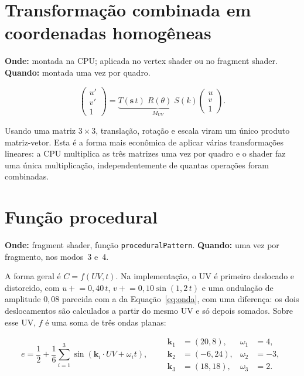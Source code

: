 \section{Transformação combinada em coordenadas homogêneas}

\textbf{Onde:} montada na CPU; aplicada no vertex shader ou no fragment shader. \textbf{Quando:} montada uma vez por quadro.

\begin{equation}
\begin{pmatrix}u'\\v'\\1\end{pmatrix}=
\underbrace{T(\mathbf{s}\,t)\;R(\theta)\;S(k)}_{M_{UV}}
\begin{pmatrix}u\\v\\1\end{pmatrix}.
\label{eq:combinada}
\end{equation}

Usando uma matriz \(3\times3\), translação, rotação e escala viram um único produto matriz-vetor. Esta é a forma mais econômica de aplicar várias transformações lineares: a CPU multiplica as três matrizes uma vez por quadro e o shader faz uma única multiplicação, independentemente de quantas operações foram combinadas.

\section{Função procedural}

\textbf{Onde:} fragment shader, função \texttt{proceduralPattern}. \textbf{Quando:} uma vez por fragmento, nos modos~3 e~4.

A forma geral é \(C=f(UV,t)\). Na implementação, o UV é primeiro deslocado e distorcido, com \(u \mathrel{+}= 0{,}40\,t\), \(v \mathrel{+}= 0{,}10\sin(1{,}2\,t)\) e uma ondulação de amplitude \(0{,}08\) parecida com a da Equação~\eqref{eq:onda}, com uma diferença: os dois deslocamentos são calculados a partir do mesmo UV e só depois somados. Sobre esse UV, \(f\) é uma soma de três ondas planas:

\begin{equation}
e = \frac{1}{2}+\frac{1}{6}\sum_{i=1}^{3}\sin\!\left(\mathbf{k}_i\cdot UV + \omega_i t\right),
\qquad
\begin{aligned}
\mathbf{k}_1&=(20,8), &\omega_1&=4,\\
\mathbf{k}_2&=(-6,24), &\omega_2&=-3,\\
\mathbf{k}_3&=(18,18), &\omega_3&=2.
\end{aligned}
\label{eq:procedural}
\end{equation}

